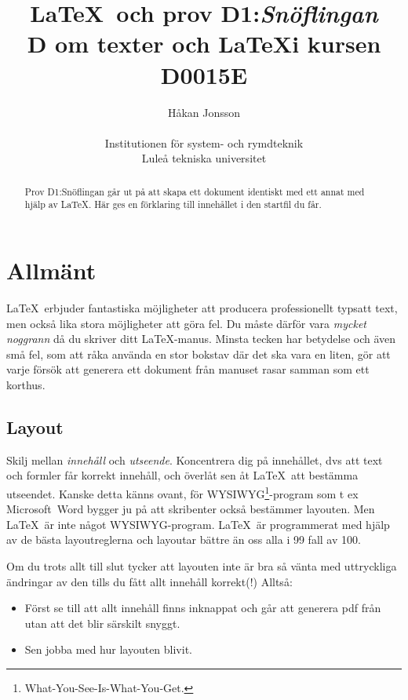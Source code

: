 \sqrt{}\documentclass[a4paper,12pt]{article}
\title{\LaTeX\ och prov D1:\emph{Snöflingan} \\
       D om texter och \LaTeX i kursen D0015E}
\author{Håkan Jonsson\\ ~\\ Institutionen för system- och
  rymdteknik \\ Luleå tekniska universitet}
\begin{document}
\maketitle

\begin{abstract}
  Prov D1:Snöflingan går ut på att skapa ett dokument identiskt med
  ett annat med hjälp av \LaTeX. Här ges en förklaring till innehållet
  i den startfil  du får.  
\end{abstract}

\section{Allmänt}

\LaTeX\ erbjuder fantastiska möjligheter att producera professionellt
typsatt text, men också lika stora möjligheter att göra fel. Du måste
därför vara \emph{mycket noggrann} då du skriver ditt
\LaTeX-manus. Minsta tecken har betydelse och även små fel, som att
råka använda en stor bokstav där det ska vara en liten, gör att varje
försök att generera ett dokument från manuset rasar samman som ett
korthus.
%
\begin{center}
  \noindent
\end{center}

\subsection{Layout}

Skilj mellan \emph{innehåll} och \emph{utseende}. Koncentrera dig på
innehållet, dvs att text och formler får korrekt innehåll, och överlåt
sen åt \LaTeX\ att bestämma utseendet. Kanske detta känns ovant, för
WYSIWYG\footnote{What-You-See-Is-What-You-Get.}-program som t ex
Microsoft~Word bygger ju på att skribenter också bestämmer
layouten. Men \LaTeX\ är inte något WYSIWYG-program. \LaTeX\ är
programmerat med hjälp av de bästa layoutreglerna och layoutar bättre
än oss alla i 99 fall av 100.

Om du trots allt till slut tycker att layouten inte är bra så vänta
med uttryckliga ändringar av den tills du fått allt innehåll
korrekt(!) Alltså:

\begin{itemize}
  \item Först se till att allt innehåll finns inknappat och går att
    generera pdf från utan att det blir särskilt snyggt.
  \item Sen jobba med hur layouten blivit. 
  \end{itemize}
  
\end{document}
